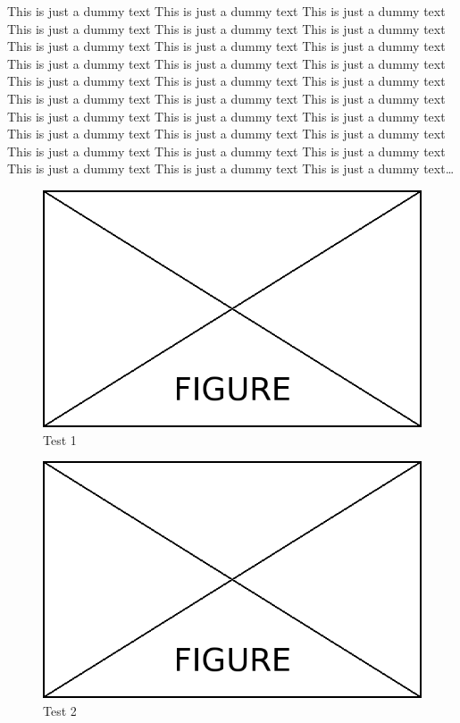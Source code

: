 \begin{paracol}{2}
	This is just a dummy text This is just a dummy text This is just a dummy text This is just a dummy text This is just a dummy text This is just a dummy text This is just a dummy text This is just a dummy text This is just a dummy text This is just a dummy text This is just a dummy text This is just a dummy text This is just a dummy text This is just a dummy text This is just a dummy text This is just a dummy text This is just a dummy text This is just a dummy text This is just a dummy text This is just a dummy text This is just a dummy text This is just a dummy text This is just a dummy text This is just a dummy text This is just a dummy text This is just a dummy text This is just a dummy text This is just a dummy text This is just a dummy text This is just a dummy text\dots
	
	\switchcolumn
	
	\begin{figure}[!h]
		\centering
		\includegraphics[width=0.3\textheight]{Content/Figures/figure.png}
		\caption{Test 1}
		\label{fig:test1}
	\end{figure}
	\vfill
	\begin{figure}[!h]
		\centering
		\includegraphics[width=0.3\textheight]{Content/Figures/figure.png}
		\caption{Test 2}
		\label{fig:test2}
	\end{figure}
\end{paracol}

